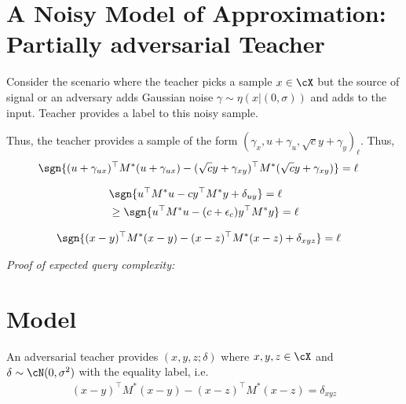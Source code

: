 \section{A Noisy Model of Approximation: Partially adversarial Teacher}


Consider the scenario where the teacher picks a sample $x \in \cX$ but the source of signal or an adversary adds Gaussian noise $\gamma \sim \eta(x| (0, \sigma))$ and adds to the input. Teacher provides a label to this noisy sample. 

Thus, the teacher provides a sample of the form $(\gamma_x, u + \gamma_u, \sqrt{c}y + \gamma_y)_{\ell}$. Thus, 
\begin{align*}
    &\sgn{ (u + \gamma_{ux})^\top M^*(u + \gamma_{ux}) - (\sqrt{c}y + \gamma_{xy})^\top M^*(\sqrt{c}y + \gamma_{xy})} = \ell%
\end{align*}

\begin{align*}
    &\sgn{ u^\top M^*u - cy^\top M^*y + \delta_{uy}} = \ell\\
    & \ge \sgn{ u^\top M^*u - (c + \epsilon_c)y^\top M^*y} = \ell
\end{align*}

\begin{align*}
    &\sgn{ (x-y)^\top M^*(x-y) - (x-z)^\top M^*(x-z) + \delta_{xyz}} = \ell
\end{align*}

\textit{Proof of expected query complexity:}

\section{Model}

An adversarial teacher provides $(x,y,z; \delta)$ where $x,y,z \in \cX$ and $\delta \sim \cN(0, \sigma^2)$ with the equality label, i.e.
\begin{align*}
    (x-y)^\top M^*(x-y) - (x-z)^\top M^*(x-z) = \delta_{xyz} 
\end{align*}